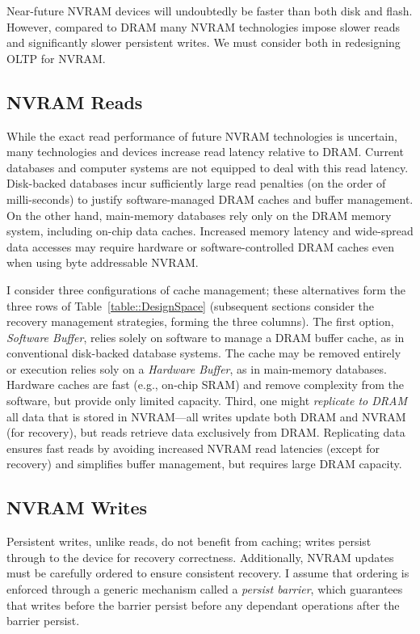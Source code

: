 

Near-future NVRAM devices will undoubtedly be faster than both disk and flash.
However, compared to DRAM many NVRAM technologies impose slower reads and significantly slower persistent writes.
We must consider both in redesigning OLTP for NVRAM.

\subsection{NVRAM Reads}
\label{sect:OLTP_design:Design:Reads}
While the exact read performance of future NVRAM technologies is uncertain, many technologies and devices increase read latency relative to DRAM.
Current databases and computer systems are not equipped to deal with this read latency.
Disk-backed databases incur sufficiently large read penalties (on the order of milli-seconds) to justify software-managed DRAM caches and buffer management.
On the other hand, main-memory databases rely only on the DRAM memory system, including on-chip data caches.
Increased memory latency and wide-spread data accesses may require hardware or software-controlled DRAM caches even when using byte addressable NVRAM.

I consider three configurations of cache management; these alternatives form the three rows of Table~\ref{table::DesignSpace} (subsequent sections consider the recovery management strategies, forming the three columns).
The first option, \emph{Software Buffer}, relies solely on software to manage a DRAM buffer cache, as in conventional disk-backed database systems.
The cache may be removed entirely or execution relies soly on a \emph{Hardware Buffer}, as in main-memory databases.
Hardware caches are fast (e.g., on-chip SRAM) and remove complexity from the software, but provide only limited capacity.
Third, one might \emph{replicate to DRAM} all data that is stored in NVRAM---all writes update both DRAM and NVRAM (for recovery), but reads retrieve data exclusively from DRAM.
Replicating data ensures fast reads by avoiding increased NVRAM read latencies (except for recovery) and simplifies buffer management, but requires large DRAM capacity.

\subsection{NVRAM Writes}
\label{sec:OLTP_design:Design:Writes}

Persistent writes, unlike reads, do not benefit from cach\-ing; writes persist through to the device for recovery correctness.
Additionally, NVRAM updates must be carefully ordered to ensure consistent recovery.
I assume that ordering is enforced through a generic mechanism called a \emph{persist barrier}, which guarantees that writes before the barrier persist before any dependant operations after the barrier persist.

